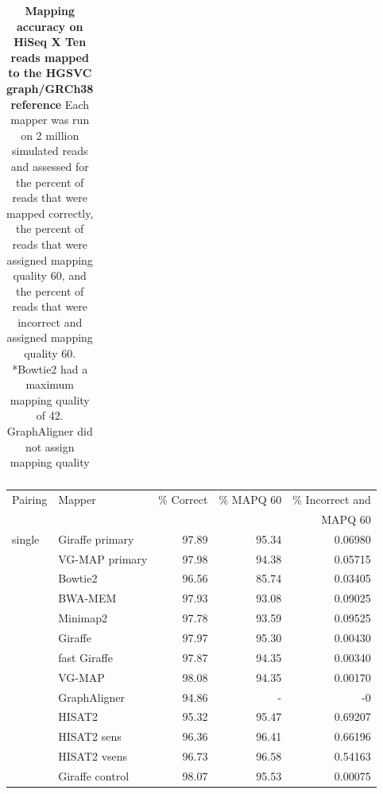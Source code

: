 \documentclass[11pt]{ucscthesis}
\begin{document}
\begin{table}[H]
\begin{tabular}{|l|l|r|r|r|}
    \end{tabular}
    \caption[Mapping accuracy on HiSeq X Ten reads mapped to the HGSVC graph/GRCh38 reference]{\textbf{Mapping accuracy on HiSeq X Ten reads mapped to the HGSVC graph/GRCh38 reference} Each mapper was run on 2 million simulated reads and assessed for the percent of reads that were mapped correctly, the percent of reads that were assigned mapping quality 60, and the percent of reads that were incorrect and assigned mapping quality 60. *Bowtie2 had a maximum mapping quality of 42. GraphAligner did not assign mapping quality}
    \label{tab:mapping_accuracy_hgsvc_hiseqxten}
\end{table}

\begin{table}[H]
    \centering
    \begin{tabular}{|l|l|r|r|r|}
    \hline
        Pairing & Mapper & \% Correct & \% MAPQ 60 & \% Incorrect and \\
               &         &            &            & MAPQ 60          \\
        \hline
        single  & Giraffe primary	& 97.89     & 95.34     & 0.06980 \\
                & VG-MAP primary	& 97.98     & 94.38     & 0.05715 \\
                & Bowtie2	        & 96.56     & 85.74     & 0.03405 \\
                & BWA-MEM	        & 97.93     & 93.08     & 0.09025 \\
                & Minimap2	        & 97.78     & 93.59     & 0.09525 \\
                & Giraffe	        & 97.97     & 95.30     & 0.00430 \\
                & fast Giraffe	    & 97.87     & 94.35     & 0.00340 \\
                & VG-MAP           	& 98.08     & 94.35     & 0.00170 \\
                & GraphAligner 	    & 94.86     & -         & -0 \\
                & HISAT2	        & 95.32     & 95.47     & 0.69207 \\
                & HISAT2 sens   	& 96.36     & 96.41     & 0.66196 \\
                & HISAT2 vsens  	& 96.73     & 96.58     & 0.54163 \\
                & Giraffe control	& 98.07     & 95.53     & 0.00075 \\


\end{tabular}
\end{table}
\end{document}
